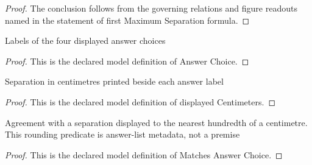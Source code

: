 \begin{proof}
  The conclusion follows from the governing relations and figure readouts named in the statement of first Maximum Separation formula.
\end{proof}
\begin{definition}
  \label{def:physics:phyx-mini-0236:phyxminiproblems-problemphyxmini0236-answerchoice}
  Labels of the four displayed answer choices
\end{definition}
\begin{proof}
  This is the declared model definition of Answer Choice.
\end{proof}
\begin{definition}
  \label{def:physics:phyx-mini-0236:phyxminiproblems-problemphyxmini0236-answerchoice-displayedcentimeters}
  Separation in centimetres printed beside each answer label
\end{definition}
\begin{proof}
  This is the declared model definition of displayed Centimeters.
\end{proof}
\begin{definition}
  \label{def:physics:phyx-mini-0236:phyxminiproblems-problemphyxmini0236-matchesanswerchoice}
  Agreement with a separation displayed to the nearest hundredth of a centimetre. This rounding predicate is answer-list metadata, not a premise
\end{definition}
\begin{proof}
  This is the declared model definition of Matches Answer Choice.
\end{proof}
